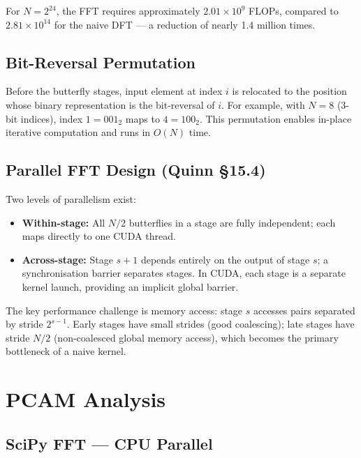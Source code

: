 \documentclass[12pt, letterpaper]{article}
\begin{document}
For $N = 2^{24}$, the FFT requires approximately $2.01 \times 10^9$ FLOPs, compared to $2.81 \times 10^{14}$ for the naive DFT --- a reduction of nearly 1.4 million times.

\subsection{Bit-Reversal Permutation}

Before the butterfly stages, input element at index $i$ is relocated to the position whose binary representation is the bit-reversal of $i$. For example, with $N = 8$ (3-bit indices), index $1 = 001_2$ maps to $4 = 100_2$. This permutation enables in-place iterative computation and runs in $O(N)$ time.

\subsection{Parallel FFT Design (Quinn \S 15.4)}

Two levels of parallelism exist:

\begin{itemize}
    \item \textbf{Within-stage:} All $N/2$ butterflies in a stage are fully independent; each maps directly to one CUDA thread.
    \item \textbf{Across-stage:} Stage $s+1$ depends entirely on the output of stage $s$; a synchronisation barrier separates stages. In CUDA, each stage is a separate kernel launch, providing an implicit global barrier.
\end{itemize}

The key performance challenge is memory access: stage $s$ accesses pairs separated by stride $2^{s-1}$. Early stages have small strides (good coalescing); late stages have stride $N/2$ (non-coalesced global memory access), which becomes the primary bottleneck of a naive kernel.

\section{PCAM Analysis}
\label{sec:pcam}

\subsection{SciPy FFT --- CPU Parallel}
\end{document}
